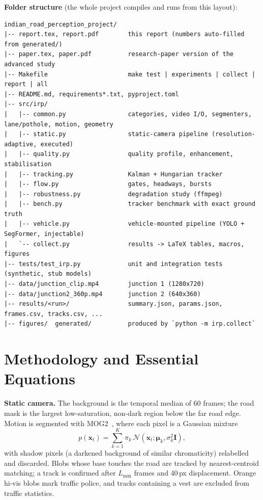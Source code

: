 \documentclass[11pt,a4paper]{article}
\begin{document}
\noindent\textbf{Folder structure} (the whole project compiles and runs from this layout):
\begin{lstlisting}[language={},numbers=none,basicstyle=\ttfamily\footnotesize]
indian_road_perception_project/
|-- report.tex, report.pdf        this report (numbers auto-filled from generated/)
|-- paper.tex, paper.pdf          research-paper version of the advanced study
|-- Makefile                      make test | experiments | collect | report | all
|-- README.md, requirements*.txt, pyproject.toml
|-- src/irp/
|   |-- common.py                 categories, video I/O, segmenters, lane/pothole, motion, geometry
|   |-- static.py                 static-camera pipeline (resolution-adaptive, executed)
|   |-- quality.py                quality profile, enhancement, stabilisation
|   |-- tracking.py               Kalman + Hungarian tracker
|   |-- flow.py                   gates, headways, bursts
|   |-- robustness.py             degradation study (ffmpeg)
|   |-- bench.py                  tracker benchmark with exact ground truth
|   |-- vehicle.py                vehicle-mounted pipeline (YOLO + SegFormer, injectable)
|   `-- collect.py                results -> LaTeX tables, macros, figures
|-- tests/test_irp.py             unit and integration tests (synthetic, stub models)
|-- data/junction_clip.mp4        junction 1 (1280x720)
|-- data/junction2_360p.mp4       junction 2 (640x360)
|-- results/<run>/                summary.json, params.json, frames.csv, tracks.csv, ...
|-- figures/  generated/          produced by `python -m irp.collect`
\end{lstlisting}

\section{Methodology and Essential Equations}
\textbf{Static camera.} The background is the temporal median of 60 frames; the road mask is the largest low-saturation, non-dark region below
the far road edge. Motion is segmented with MOG2~\cite{zivkovic2004}, where each pixel is a Gaussian mixture
\begin{equation}
p(\mathbf{x}_t)=\sum_{k=1}^{K}\pi_k\,\mathcal{N}\!\left(\mathbf{x}_t;\boldsymbol\mu_k,\sigma_k^2\mathbf{I}\right),
\end{equation}
with shadow pixels (a darkened background of similar chromaticity) relabelled and discarded. Blobs whose base touches the road are tracked by
nearest-centroid matching; a track is confirmed after $L_{\min}$ frames and 40\,px displacement. Orange hi-vis blobs mark traffic police, and
tracks containing a vest are excluded from traffic statistics.
\end{document}
